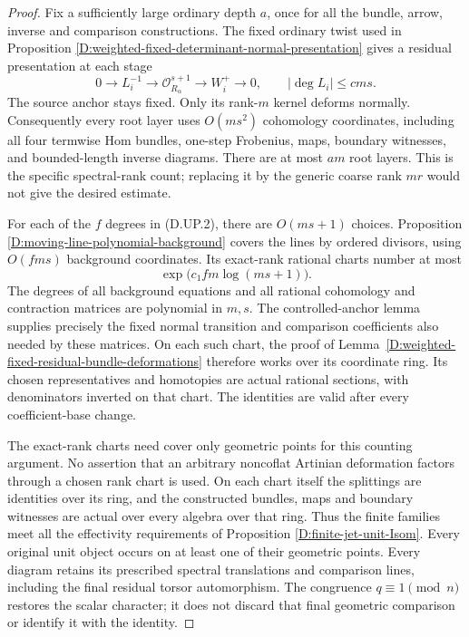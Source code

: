 \begin{proof}
Fix a sufficiently large ordinary depth $a$, once for all
the bundle, arrow, inverse and comparison constructions.
The fixed ordinary twist used in Proposition
\ref{D:weighted-fixed-determinant-normal-presentation}
gives a residual presentation at each stage
\[
 0\longrightarrow L_i^{-1}\longrightarrow
 \mathcal O_{R_\alpha}^{s+1}\longrightarrow W_i^+
 \longrightarrow0,\qquad |\deg L_i|\leq c ms.          \tag{D.UP.2}
\]
The source anchor stays fixed. Only its rank-$m$ kernel
deforms normally. Consequently every root layer uses
$O(ms^2)$ cohomology coordinates, including all four
termwise Hom bundles, one-step Frobenius, maps, boundary
witnesses, and bounded-length inverse diagrams.
There are at most $am$ root layers. This is the specific
spectral-rank count; replacing it by the generic coarse
rank $mr$ would not give the desired estimate.

For each of the $f$ degrees in (D.UP.2), there are
$O(ms+1)$ choices. Proposition
\ref{D:moving-line-polynomial-background} covers the lines
by ordered divisors, using $O(fms)$ background coordinates.
Its exact-rank rational charts number at most
\[
 \exp\bigl(c_1fm\log(ms+1)\bigr).                     \tag{D.UP.3}
\]
The degrees of all background equations and all rational
cohomology and contraction matrices are polynomial in $m,s$.
The controlled-anchor lemma supplies precisely the fixed
normal transition and comparison coefficients also needed
by these matrices. On each such chart, the proof of
Lemma~\ref{D:weighted-fixed-residual-bundle-deformations}
therefore works over its coordinate ring. Its chosen
representatives and homotopies are actual rational sections,
with denominators inverted on that chart. The identities
are valid after every coefficient-base change.

The exact-rank charts need cover only geometric points for
this counting argument. No assertion that an arbitrary
noncoflat Artinian deformation factors through a chosen
rank chart is used. On each chart itself the splittings
are identities over its ring, and the constructed bundles,
maps and boundary witnesses are actual over every algebra
over that ring. Thus the finite families meet all the
effectivity requirements of Proposition
\ref{D:finite-jet-unit-Isom}. Every original unit object
occurs on at least one of their geometric points.
Every diagram retains its prescribed spectral translations
and comparison lines, including the final residual torsor
automorphism. The congruence $q\equiv1\pmod n$ restores the
scalar character; it does not discard that final geometric
comparison or identify it with the identity.


\end{proof}
